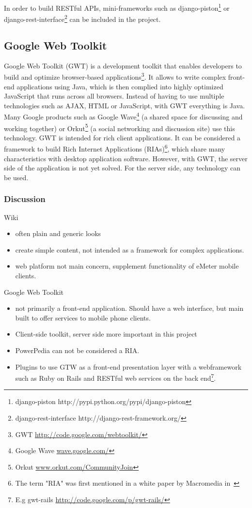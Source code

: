 In order to build RESTful APIs, mini-frameworks such as django-piston\footnote{django-piston http://pypi.python.org/pypi/django-piston} or django-rest-interface\footnote{django-rest-interface http://django-rest-framework.org/} can be included in the project.  

\subsection{Google Web Toolkit}
Google Web Toolkit (GWT) is a development toolkit that enables developers to build and optimize browser-based applications\footnote{GWT \url{http://code.google.com/webtoolkit/}}.  It allows to write complex front-end applications using Java, which is then complied into highly optimized JavaScript that runs across all browsers. Instead of having to use multiple technologies such as AJAX, HTML or JavaScript, with GWT everything is Java. Many Google products such as Google Wave\footnote{Google Wave \url{wave.google.com/}} (a shared space for discussing and working together) or Orkut\footnote{Orkut \url{www.orkut.com/CommunityJoin}} (a social networking and discussion site) use this technology. GWT is intended for rich client applications. It can be considered a framework to build Rich Internet Applications (RIAs)\footnote{The term "RIA" was first mentioned in a white paper by Macromedia in~\cite{ria}}, which share many characteristics with desktop application software. 
However, with GWT, the server side of the application is not yet solved. For the server side, any technology can be used. 



\subsubsection{Discussion}
Wiki
\begin{itemize}
\item often plain and generic looks
\item create simple content, not intended as a framework for complex applications. 
\item web platform not main concern, supplement functionality of eMeter mobile clients.
\end{itemize}

Google Web Toolkit
\begin{itemize}
 \item not primarily a front-end application. Should have a web interface, but main built to offer services to mobile phone clients. 
 \item Client-side toolkit, server side more important in this project
 \item PowerPedia can not be considered a RIA.
 \item Plugins to use GTW as a front-end presentation layer with a webframework such as Ruby on Rails and RESTful web services on the back end\footnote{E.g gwt-rails \url{http://code.google.com/p/gwt-rails/}}.
\end{itemize}

